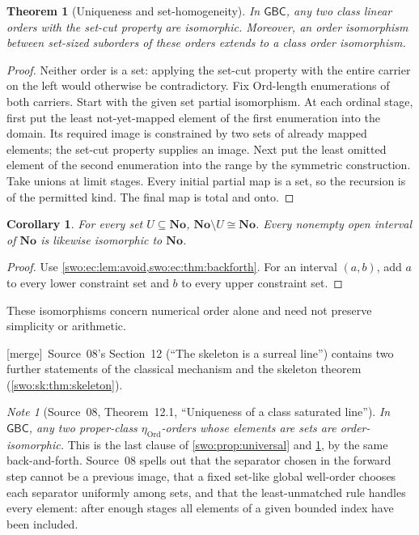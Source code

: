 \documentclass[11pt]{article}
\newtheorem{theorem}{Theorem}[section]
\newtheorem{corollary}[corollary]{Corollary}
\theoremstyle{definition}
\theoremstyle{remark}
\newtheorem{note}[note]{Note}
\newcommand{\No}{\mathbf{No}}
\newcommand{\Ord}{\mathrm{Ord}}
\newcommand{\GBC}{\mathsf{GBC}}
\newcommand{\merge}{\textsf{[merge]}}
\begin{document}
\begin{theorem}[Uniqueness and set-homogeneity]\label{swo:ec:thm:backforth}
In $\GBC$, any two class linear orders with the set-cut property are
isomorphic. Moreover, an order isomorphism between set-sized suborders
of these orders extends to a class order isomorphism.
\end{theorem}
\begin{proof}
Neither order is a set: applying the set-cut property with the entire
carrier on the left would otherwise be contradictory. Fix $\Ord$-length
enumerations of both carriers. Start with the given set partial
isomorphism. At each ordinal stage, first put the least not-yet-mapped
element of the first enumeration into the domain. Its required image
is constrained by two sets of already mapped elements; the set-cut
property supplies an image. Next put the least omitted element of the
second enumeration into the range by the symmetric construction. Take
unions at limit stages. Every initial partial map is a set, so the
recursion is of the permitted kind. The final map is total and onto.
\end{proof}

\begin{corollary}\label{swo:ec:cor:removed}
For every set $U\subseteq\No$, $\No\setminus U\cong\No$. Every nonempty
open interval of $\No$ is likewise isomorphic to $\No$.
\end{corollary}
\begin{proof}
Use \cref{swo:ec:lem:avoid,swo:ec:thm:backforth}. For an interval $(a,b)$, add $a$ to
every lower constraint set and $b$ to every upper constraint set.
\end{proof}
These isomorphisms concern numerical order alone and need not preserve
simplicity or arithmetic.


\merge\ Source~08's Section~12 (``The skeleton is a surreal
line'')\label{swo:sk:sec:universality} contains two further statements of the
classical mechanism and the skeleton theorem
(\cref{swo:sk:thm:skeleton}).

\begin{note}[Source~08, Theorem~12.1, ``Uniqueness of a class saturated line'']\label{swo:sk:thm:classunique}
\emph{In $\GBC$, any two proper-class $\eta_{\Ord}$-orders whose elements are
sets are order-isomorphic.} This is the last clause of
\cref{swo:prop:universal} and \cref{swo:ec:thm:backforth}, by the same
back-and-forth. Source~08 spells out that the separator chosen in the forward
step cannot be a previous image, that a fixed set-like global well-order
chooses each separator uniformly among sets, and that the least-unmatched
rule handles every element: after enough stages all elements of a given
bounded index have been included.
\end{note}
\end{document}
